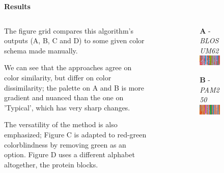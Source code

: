 \documentclass[bigger]{beamer}
\newcommand{\tb}[1]{\textbf{#1}}
\newcommand{\ti}[1]{\textit{#1}}
\begin{document}
\begin{frame}{\tb{Results}}
    \footnotesize
    
    \begin{columns}[T, onlytextwidth]
        \begin{column}{0.45\textwidth}
            The figure grid compares this algorithm's outputs (A, B, C and D) to some given
            color schema made manually.

            \hfill

            We can see that the approaches agree on color similarity, but differ on color dissimilarity; the palette on A and B is more gradient and nuanced than the one on 'Typical', which has very sharp changes.

            \hfill

            The versatility of the method is also emphasized; Figure C is adapted to red-green colorblindness by removing green as an option. Figure D uses a different alphabet altogether, the protein blocks.
        \end{column}
        
        \begin{column}{0.55\textwidth}
            \begin{figure}
                \begin{subfigure}[t]{.4\linewidth}
                    \tb{A} - {\scriptsize \ti{BLOSUM62}}
                    \includegraphics[scale=0.2, valign=t, frame]{images/A.png}
                \end{subfigure}\hfill
                \begin{subfigure}[t]{.4\linewidth}
                    \tb{B} - {\scriptsize \ti{PAM250}}
                    \includegraphics[scale=0.2, valign=t, frame]{images/B.png}
                \end{subfigure}
    

\end{figure}
\end{column}
\end{columns}
\end{frame}
\end{document}

